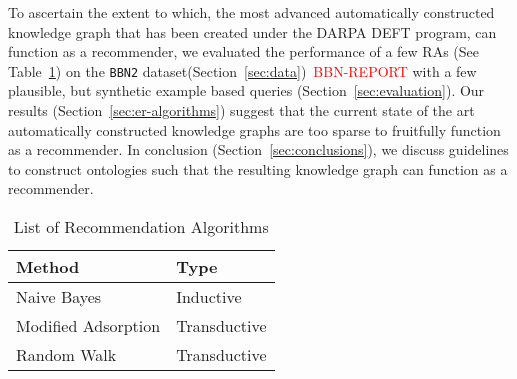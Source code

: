\documentclass[paper=a4,fontsize=11pt]{scrartcl}
\newcommand{\Secref}[1]{Section~\ref{#1}}
\newcommand{\Tabref}[1]{Table~\ref{#1}}
\numberwithin{equation}{section}    %
\numberwithin{figure}{section}      %
\numberwithin{table}{section}       %
\renewcommand{\cite}[1]{\textcolor{red}{#1}}
\newcommand{\dataset}[0]{\texttt{BBN2} dataset}
\begin{document}
To ascertain the extent to which, the most advanced automatically
constructed knowledge graph that has been created under the DARPA DEFT program,
can function as a recommender, we evaluated the performance of a few RAs (See \Tabref{tab:ra}) on the
\dataset (\Secref{sec:data})~\cite{BBN-REPORT} with a few plausible, but
synthetic example based queries (\Secref{sec:evaluation}).
Our results (\Secref{sec:er-algorithms}) suggest that the current state of
the art automatically constructed knowledge graphs are too sparse to fruitfully
function as a recommender. In conclusion (\Secref{sec:conclusions}), we discuss
guidelines to construct ontologies such that the resulting knowledge graph can
function as a recommender.

\begin{table}[htbp]
  \centering
  \begin{tabular}{l l}
    Method              & Type         \\\hline
    Naive Bayes         & Inductive    \\
    Modified Adsorption & Transductive \\
    Random Walk         & Transductive \\
  \end{tabular}
  \caption{List of Recommendation Algorithms}
  \label{tab:ra}
\end{table}

\end{document}
